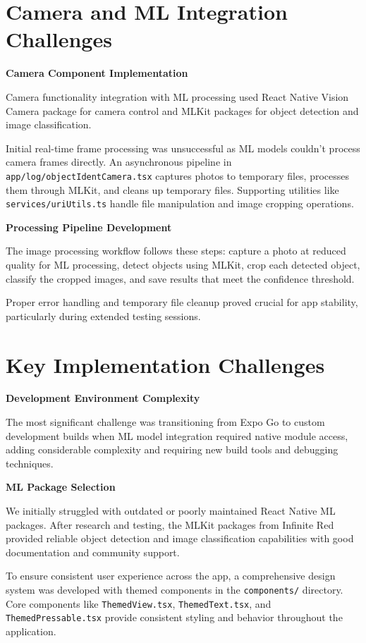 \section{Camera and ML Integration Challenges}

\textbf{Camera Component Implementation}

Camera functionality integration with ML processing used React Native Vision Camera package for camera control and MLKit packages for object detection and image classification.

Initial real-time frame processing was unsuccessful as ML models couldn't process camera frames directly. An asynchronous pipeline in \texttt{app/log/objectIdentCamera.tsx} captures photos to temporary files, processes them through MLKit, and cleans up temporary files. Supporting utilities like \texttt{services/uriUtils.ts} handle file manipulation and image cropping operations.

\textbf{Processing Pipeline Development}

The image processing workflow follows these steps: capture a photo at reduced quality for ML processing, detect objects using MLKit, crop each detected object, classify the cropped images, and save results that meet the confidence threshold.

Proper error handling and temporary file cleanup proved crucial for app stability, particularly during extended testing sessions.

\section{Key Implementation Challenges}

\textbf{Development Environment Complexity}

The most significant challenge was transitioning from Expo Go to custom development builds when ML model integration required native module access, adding considerable complexity and requiring new build tools and debugging techniques.

\textbf{ML Package Selection}

We initially struggled with outdated or poorly maintained React Native ML packages. After research and testing, the MLKit packages from Infinite Red provided reliable object detection and image classification capabilities with good documentation and community support.

To ensure consistent user experience across the app, a comprehensive design system was developed with themed components in the \texttt{components/} directory. Core components like \texttt{ThemedView.tsx}, \texttt{ThemedText.tsx}, and \texttt{ThemedPressable.tsx} provide consistent styling and behavior throughout the application.

